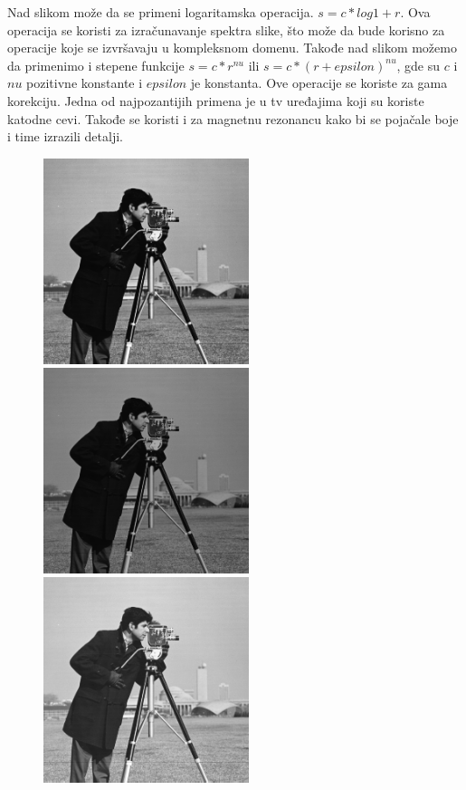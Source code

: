 \documentclass[a4paper,12pt,titlepage]{article}
\begin{document}
Nad slikom može da se primeni logaritamska operacija. $s = c*log{1+ r}$. Ova operacija se koristi za izračunavanje spektra slike, što može da bude korisno za operacije koje se izvršavaju u kompleksnom domenu. Takođe nad slikom možemo da primenimo i stepene funkcije $s = c*r^{nu}$ ili $s = c*(r + epsilon)^{nu}$, gde su $c$ i $nu$ pozitivne konstante i $epsilon$ je konstanta. Ove operacije se koriste za gama korekciju. Jedna od najpozantijih primena je u tv uređajima koji su koriste katodne cevi. Takođe se koristi i za magnetnu rezonancu kako bi se pojačale boje i time izrazili detalji. 

\begin{figure}[ht!]
\centering
\includegraphics[width=60mm]{img/img.png}
\includegraphics[width=60mm]{img/imgLog.png}
\includegraphics[width=60mm]{img/imgPow1.png}

\end{figure}
\end{document}
